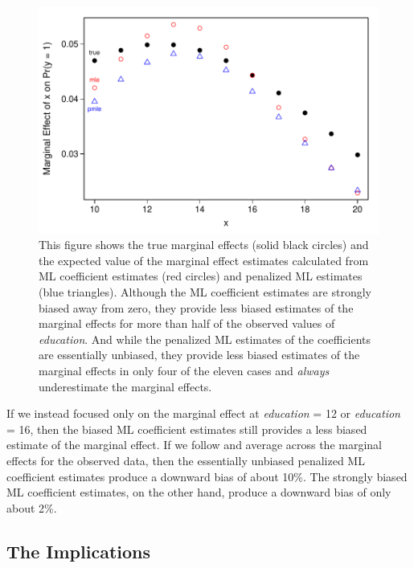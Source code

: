 \documentclass[12pt]{article}
\begin{document}
\begin{figure}[h!]
\begin{center}
\includegraphics[scale = 0.7]{figs/logit-me-bias.pdf}
\caption{This figure shows the true marginal effects (solid black circles) and the expected value of the marginal effect estimates calculated from ML coefficient estimates (red circles) and penalized ML estimates (blue triangles). 
Although the ML coefficient estimates are strongly biased away from zero, they provide less biased estimates of the marginal effects for more than half of the observed values of \textit{education}. 
And while the penalized ML estimates of the coefficients are essentially unbiased, they provide less biased estimates of the marginal effects in only four of the eleven cases and \textit{always} underestimate the marginal effects.}\label{fig:logit-me-bias}
\end{center}
\end{figure}

If we instead focused only on the marginal effect at \textit{education} = 12 or \textit{education} = 16, then the biased ML coefficient estimates still provides a less biased estimate of the marginal effect. 
If we follow \cite{HanmerKalkan2013} and average across the marginal effects for the observed data, then the essentially unbiased penalized ML coefficient estimates produce a downward bias of about 10\%. 
The strongly biased ML coefficient estimates, on the other hand, produce a downward bias of only about 2\%.

\subsection*{The Implications}
\end{document}
